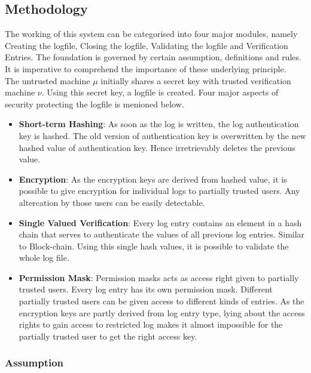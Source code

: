 \documentclass[12pt, letter]{article}
\begin{document}
\subsection{Methodology}

The working of this system can be categorised into four major modules, namely Creating the logfile, Closing the logfile, Validating the logfile and Verification Entries. The foundation is governed by certain assumption, definitions and rules. It is imperative to comprehend the importance of these underlying principle.\\


The untrusted machine $\mu$ initially shares a secret key with trusted verification machine $\nu$. Using this secret key, a logfile is created. Four major aspects of security protecting the logfile is menioned below.

\begin{itemize}
    \item \textbf{Short-term Hashing}: As soon as the log is written, the log authentication key is hashed. The old version of authentication key is overwritten by the new hashed value of authentication key. Hence irretrievably deletes the previous value.
    
    \item \textbf{Encryption}: As the encryption keys are derived from hashed value, it is possible to give encryption for individual logs to partially trusted users. Any altercation by those users can be easily detectable.
    
    \item \textbf{Single Valued Verification}: Every log entry contains an element in a hash chain that serves to authenticate the values of all previous log entries. Similar to Block-chain. Using this single hash values, it is possible to validate the whole log file.
    
    \item \textbf{Permission Mask}: Permission masks acts as access right given to partially trusted users. Every log entry has its own permission mask. Different partially trusted users can be given access to different kinds of entries. As the encryption keys are partly derived from log entry type, lying about the access rights to gain access to restricted log makes it almost impossible for the partially trusted user to get the right access key.
    
\end{itemize}

\subsubsection{Assumption}
\end{document}
